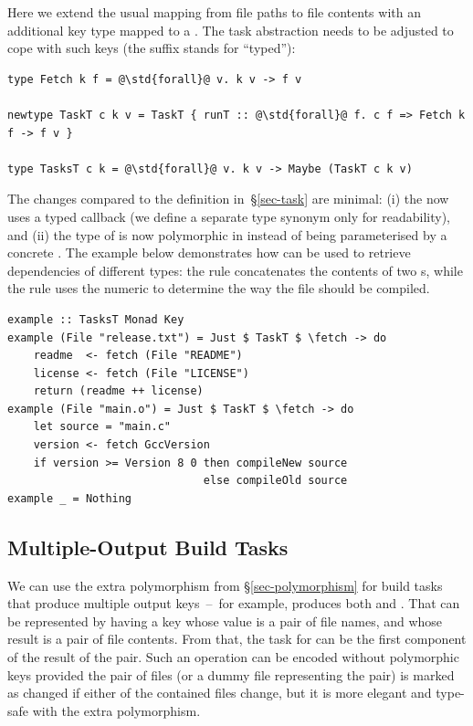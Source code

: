 \noindent
Here we extend the usual mapping from file paths to file contents with an
additional key type  mapped to a . The task
abstraction needs to be adjusted to cope with such keys (the suffix 
stands for ``typed''):

\vspace{1mm}
\begin{verbatim}
type Fetch k f = @\std{forall}@ v. k v -> f v

newtype TaskT c k v = TaskT { runT :: @\std{forall}@ f. c f => Fetch k f -> f v }

type TasksT c k = @\std{forall}@ v. k v -> Maybe (TaskT c k v)
\end{verbatim}
\vspace{1mm}

\noindent
The changes compared to the definition in~\S\ref{sec-task} are minimal: (i) the
 now uses a typed  callback (we define a separate type
synonym only for readability), and (ii) the type of  is now
polymorphic in  instead of being parameterised by a concrete . The
example below demonstrates how  can be used to retrieve dependencies
of different types: the rule  concatenates the contents of two
s, while the rule  uses the numeric  to
determine the way the  file should be compiled.

\vspace{1mm}
\begin{verbatim}
example :: TasksT Monad Key
example (File "release.txt") = Just $ TaskT $ \fetch -> do
    readme  <- fetch (File "README")
    license <- fetch (File "LICENSE")
    return (readme ++ license)
example (File "main.o") = Just $ TaskT $ \fetch -> do
    let source = "main.c"
    version <- fetch GccVersion
    if version >= Version 8 0 then compileNew source
                              else compileOld source
example _ = Nothing
\end{verbatim}
\vspace{1mm}

\subsection{Multiple-Output Build Tasks}\label{sec-multiple-outputs}

We can use the extra polymorphism from \S\ref{sec-polymorphism} for build tasks that produce multiple output
keys~--~for example,  produces both  and .
That can be represented by having a key whose value is a pair of file names, and
whose result is a pair of file contents. From that, the task for 
can be the first component of the result of the pair. Such an operation
can be encoded without polymorphic keys provided the pair of files (or a dummy
file representing the pair) is marked as changed if either of the contained
files change, but it is more elegant and type-safe with the extra polymorphism.

